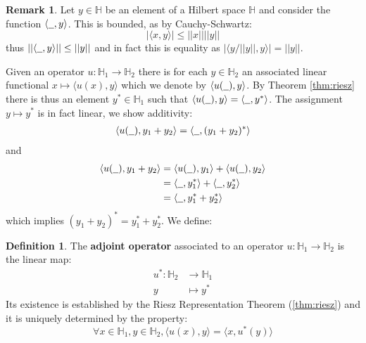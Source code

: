 \documentclass[12pt]{article}
\theoremstyle{plain}
\theoremstyle{definition}
\newtheorem{defn}[thm]{Definition} %
\newtheorem{remark}[thm]{Remark}
\newcommand{\bb}[1]{\mathbb{#1}}
\newcommand{\und}[1]{\underline{\hspace{#1 cm}}}
\newcommand{\lto}{\longrightarrow}
\begin{document}
\begin{remark}
\label{rmk:bounded_inner_product} Let $y \in \bb{H}$ be an element of a Hilbert space $\bb{H}$ and consider the function $\langle \und{0.2},y\rangle$. This is bounded, as by Cauchy-Schwartz:
\[|\langle x,y\rangle| \leq ||x||||y||\]
thus $||\langle \und{0.2},y\rangle|| \leq ||y||$ and in fact this is equality as $|\langle y/||y||,y\rangle| = ||y||$.
\end{remark}
Given an operator $u: \bb{H}_1 \lto \bb{H}_2$ there is for each $y \in \bb{H}_2$ an associated linear functional $x \longmapsto \langle u(x),y\rangle$ which we denote by $\langle u(\und{0.2}),y\rangle$. By Theorem \ref{thm:riesz} there is thus an element $y^\ast \in \bb{H}_1$ such that $\langle u(\und{0.2}),y\rangle = \langle \und{0.2}, y^\ast\rangle$. The assignment $y \mapsto y^\ast$ is in fact linear, we show additivity:
\begin{align*}
    \langle u(\und{0.2}), y_1 + y_2\rangle &= \langle \und{0.2}, (y_1 + y_2)^\ast\rangle\\
\end{align*}
and
\begin{align*}
    \langle u(\und{0.2}), y_1 + y_2\rangle &= \langle u(\und{0.2}), y_1\rangle + \langle u(\und{0.2}), y_2\rangle\\
    &= \langle \und{0.2}, y_1^\ast\rangle + \langle \und{0.2}, y_2^\ast\rangle\\
    &= \langle \und{0.2}, y_1^\ast + y_2^\ast\rangle
\end{align*}
which implies $(y_1 + y_2)^\ast = y_1^\ast + y_2^\ast$. We define:
\begin{defn}
The \textbf{adjoint operator} associated to an operator $u: \bb{H}_1 \lto \bb{H}_2$ is the linear map:
\begin{align*}
    u^\ast: \bb{H}_2 &\lto \bb{H}_1\\
    y &\longmapsto y^\ast
\end{align*}
Its existence is established by the Riesz Representation Theorem (\ref{thm:riesz}) and it is uniquely determined by the property:
\begin{equation}
    \forall x\in\bb{H}_1,y\in\bb{H}_2, \langle u(x),y\rangle = \langle x, u^\ast(y)\rangle
\end{equation}
\end{defn}
\end{document}
